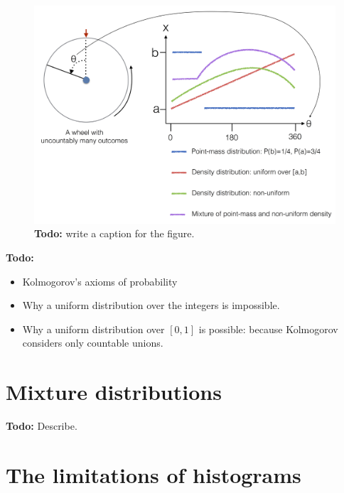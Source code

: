 \begin{figure}[th]
\begin{center}
\includegraphics[width=5in]{figs/WheelsOfChanceUncountable.png}
\end{center}
\caption{{\bf Todo:} write a caption for the figure.
\label{fig:Wheel-of-chance-uncountable}}
\end{figure}

{\bf Todo: } 
\begin{itemize}
\item Kolmogorov's axioms of probability
\item Why a uniform distribution over the integers is impossible.
\item Why a uniform distribution over $[0,1]$ is possible: because
  Kolmogorov considers only countable unions.
\end{itemize}


\section{Mixture distributions}

{\bf Todo:} Describe.
\section{The limitations of histograms}

